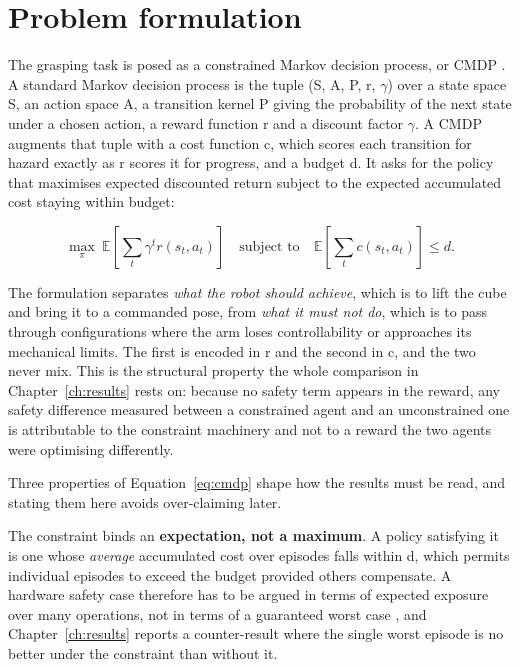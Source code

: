 \section{Problem formulation}\label{sec:m-cmdp}

The grasping task is posed as a constrained Markov decision process, or CMDP
\cite{altman1999cmdp}. A standard Markov decision process is the tuple
(S, A, P, r, \(\gamma\)) over a state space S, an action space A, a transition kernel P giving the
probability of the next state under a chosen action, a reward function r and a discount factor
\(\gamma\). A CMDP augments that tuple with a cost function c, which scores each transition for
hazard exactly as r scores it for progress, and a budget d. It asks for the policy that maximises
expected discounted return subject to the expected accumulated cost staying within budget:

\begin{equation}
  \max_{\pi}\ \mathbb{E}\!\left[\sum_{t}\gamma^{t} r(s_t,a_t)\right]
  \quad\text{subject to}\quad
  \mathbb{E}\!\left[\sum_{t} c(s_t,a_t)\right] \le d .
  \label{eq:cmdp}
\end{equation}

The formulation separates \emph{what the robot should achieve}, which is to lift the cube and bring
it to a commanded pose, from \emph{what it must not do}, which is to pass through configurations
where the arm loses controllability or approaches its mechanical limits. The first is encoded in r
and the second in c, and the two never mix. This is the structural property the whole comparison in
Chapter~\ref{ch:results} rests on: because no safety term appears in the reward, any safety
difference measured between a constrained agent and an unconstrained one is attributable to the
constraint machinery and not to a reward the two agents were optimising differently.

Three properties of Equation~\ref{eq:cmdp} shape how the results must be read, and stating them
here avoids over-claiming later.

The constraint binds an \textbf{expectation, not a maximum}. A policy satisfying it is one whose
\emph{average} accumulated cost over episodes falls within d, which permits individual episodes to
exceed the budget provided others compensate. A hardware safety case therefore has to be argued in
terms of expected exposure over many operations, not in terms of a guaranteed worst case
\cite{brunke2022safe}, and Chapter~\ref{ch:results} reports a counter-result where the single worst
episode is no better under the constraint than without it.


